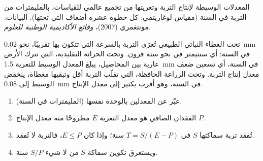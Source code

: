 \begin{omfigure}

{\small المعدلات الوسيطة لإنتاج التربة وتعريتها من تجميع عالمي للقياسات، بالمليمترات
من التربة في السنة (مقياس لوغاريتمي: كل خطوة عشرة أضعاف التي تحتها). البيانات:
مونتغمري (2007)،
\emph{وقائع الأكاديمية الوطنية للعلوم}.}
\end{omfigure}

تحت الغطاء النباتي الطبيعي تُعرّى التربة بالسرعة التي تتكون بها تقريبًا، نحو
\qty{0.02}{mm} في السنة: أي سنتيمتر في نحو ستة قرون. وتحت الحراثة التقليدية، التي
تترك الأرض عارية بين المحاصيل، يبلغ المعدل الوسيط للتعرية
\qty{1.5}{mm} في السنة، أي تسعين ضعف معدل إنتاج التربة. وتحت الزراعة الحافظة، التي
تقلّب التربة أقل وتبقيها مغطاة، ينخفض الوسيط إلى \qty{0.08}{mm} في السنة، وهو أقرب
بكثير إلى معدل
الإنتاج.

\begin{method}\label{met:g10:soil-formation:rates}
\begin{enumerate}
  \item عبّر عن المعدلين بالوحدة نفسها (المليمترات في السنة).
  \item الفقدان الصافي هو معدل التعرية $E$ مطروحًا منه معدل الإنتاج $P$.
  \item تُفقد تربة سماكتها $S$ في $T = S/(E - P)$ سنة؛ وإذا كان
        $E \le P$، فالتربة لا تُفقد.
  \item ويستغرق تكوين سماكة $S$ من لا شيء $S/P$ سنة.
\end{enumerate}
\end{method}

